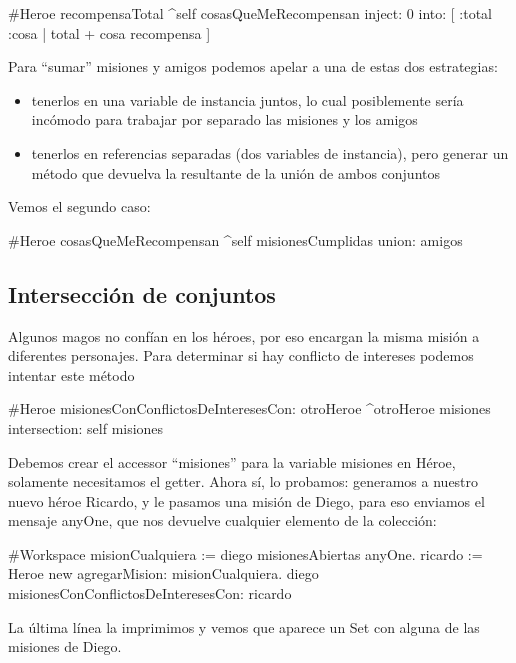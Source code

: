 \documentclass[a4paper,12pt]{book}
\begin{document}
\begin{code}
#Heroe
recompensaTotal
   ^self cosasQueMeRecompensan inject: 0
                               into: [ :total :cosa | total + cosa recompensa ]
\end{code}

Para ``sumar'' misiones y amigos podemos apelar a una de estas dos estrategias:

\begin{itemize}
 \item tenerlos en una variable de instancia juntos, lo cual posiblemente sería incómodo para trabajar
 por separado las misiones y los amigos
 \item tenerlos en referencias separadas (dos variables de instancia), pero generar un método que devuelva
 la resultante de la unión de ambos conjuntos
\end{itemize}

Vemos el segundo caso:

\begin{code}
#Heroe
cosasQueMeRecompensan
    ^self misionesCumplidas union: amigos
\end{code}

\subsection{Intersección de conjuntos}
Algunos magos no confían en los héroes, por eso encargan la misma misión a diferentes personajes. Para determinar
si hay conflicto de intereses podemos intentar este método

\begin{code}
#Heroe
misionesConConflictosDeInteresesCon: otroHeroe
     ^otroHeroe misiones intersection: self misiones
\end{code}

Debemos crear el accessor ``misiones'' para la variable misiones en Héroe, solamente necesitamos el getter. 
Ahora sí, lo probamos: generamos a nuestro nuevo héroe Ricardo, y le pasamos una misión de Diego, 
para eso enviamos el mensaje anyOne, que nos devuelve cualquier elemento de la colección:

\begin{code}
#Workspace
 misionCualquiera := diego misionesAbiertas anyOne.
 ricardo := Heroe new agregarMision: misionCualquiera.
 diego misionesConConflictosDeInteresesCon: ricardo
\end{code}

La última línea la imprimimos y vemos que aparece un Set con alguna de las misiones de Diego.
\end{document}
